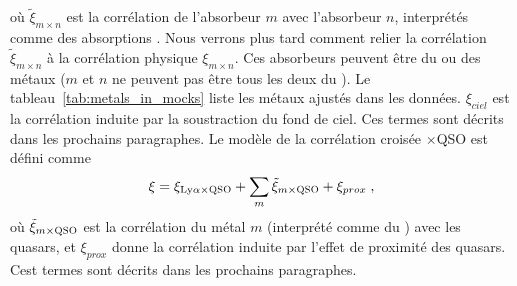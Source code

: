 où $\tilde \xi_{m \times n}$ est la corrélation de l'absorbeur $m$ avec l'absorbeur $n$, interprétés comme des absorptions \lya{}.
  Nous verrons plus tard comment relier la  corrélation $\tilde \xi_{m \times n}$ à la corrélation physique $\xi_{m \times n}$.
  Ces absorbeurs peuvent être du \lya{} ou des métaux ($m$ et $n$ ne peuvent pas être tous les deux du \lya{}). Le tableau~\ref{tab:metals_in_mocks} liste les métaux ajustés dans les données. $\xi_{ciel}$ est la corrélation induite par la soustraction du fond de ciel. Ces termes sont décrits dans les prochains paragraphes.
Le modèle de la corrélation croisée \lya{}$\times$QSO est défini comme
\begin{equation}
  \label{eq:xcf_model1}
  \xi = \xi_{\mathrm{Ly}\alpha\times \textsc{QSO}} + \sum_{m} \tilde \xi_{m \times \textsc{QSO}} + \xi_{prox} \; ,
\end{equation}
où $\tilde \xi_{m \times \textsc{QSO}}$ est la corrélation du métal $m$ (interprété comme du \lya{}) avec les quasars, et $\xi_{prox}$ donne la corrélation induite par l'effet de proximité des quasars. Cest termes sont décrits dans les prochains paragraphes.

